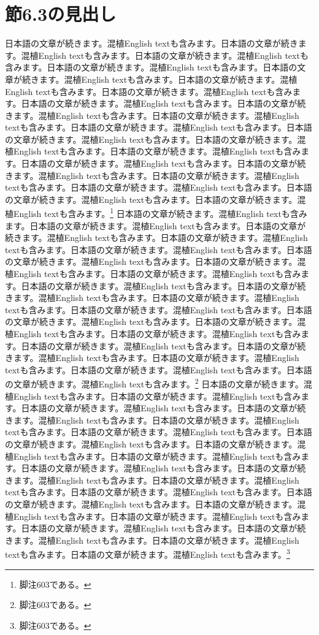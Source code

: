 \documentclass[pdflatex,book]{jlreq}
\begin{document}
\section{節6.3の見出し}
日本語の文章が続きます。混植English textも含みます。日本語の文章が続きます。混植English textも含みます。日本語の文章が続きます。混植English textも含みます。日本語の文章が続きます。混植English textも含みます。日本語の文章が続きます。混植English textも含みます。日本語の文章が続きます。混植English textも含みます。日本語の文章が続きます。混植English textも含みます。日本語の文章が続きます。混植English textも含みます。日本語の文章が続きます。混植English textも含みます。日本語の文章が続きます。混植English textも含みます。日本語の文章が続きます。混植English textも含みます。日本語の文章が続きます。混植English textも含みます。日本語の文章が続きます。混植English textも含みます。日本語の文章が続きます。混植English textも含みます。日本語の文章が続きます。混植English textも含みます。日本語の文章が続きます。混植English textも含みます。日本語の文章が続きます。混植English textも含みます。日本語の文章が続きます。混植English textも含みます。日本語の文章が続きます。混植English textも含みます。日本語の文章が続きます。混植English textも含みます。\footnote{脚注603である。}
日本語の文章が続きます。混植English textも含みます。日本語の文章が続きます。混植English textも含みます。日本語の文章が続きます。混植English textも含みます。日本語の文章が続きます。混植English textも含みます。日本語の文章が続きます。混植English textも含みます。日本語の文章が続きます。混植English textも含みます。日本語の文章が続きます。混植English textも含みます。日本語の文章が続きます。混植English textも含みます。日本語の文章が続きます。混植English textも含みます。日本語の文章が続きます。混植English textも含みます。日本語の文章が続きます。混植English textも含みます。日本語の文章が続きます。混植English textも含みます。日本語の文章が続きます。混植English textも含みます。日本語の文章が続きます。混植English textも含みます。日本語の文章が続きます。混植English textも含みます。日本語の文章が続きます。混植English textも含みます。日本語の文章が続きます。混植English textも含みます。日本語の文章が続きます。混植English textも含みます。日本語の文章が続きます。混植English textも含みます。日本語の文章が続きます。混植English textも含みます。\footnote{脚注603である。}
日本語の文章が続きます。混植English textも含みます。日本語の文章が続きます。混植English textも含みます。日本語の文章が続きます。混植English textも含みます。日本語の文章が続きます。混植English textも含みます。日本語の文章が続きます。混植English textも含みます。日本語の文章が続きます。混植English textも含みます。日本語の文章が続きます。混植English textも含みます。日本語の文章が続きます。混植English textも含みます。日本語の文章が続きます。混植English textも含みます。日本語の文章が続きます。混植English textも含みます。日本語の文章が続きます。混植English textも含みます。日本語の文章が続きます。混植English textも含みます。日本語の文章が続きます。混植English textも含みます。日本語の文章が続きます。混植English textも含みます。日本語の文章が続きます。混植English textも含みます。日本語の文章が続きます。混植English textも含みます。日本語の文章が続きます。混植English textも含みます。日本語の文章が続きます。混植English textも含みます。日本語の文章が続きます。混植English textも含みます。日本語の文章が続きます。混植English textも含みます。\footnote{脚注603である。}
\end{document}
